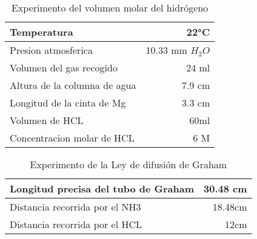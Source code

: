 \documentclass[../main.tex]{subfiles}
\begin{document}
\begin{table}[H]
    \centering
    \begin{tabular}{|l|r|}
        \hline
        Temperatura & 22°C \\
        \hline
        Presion atmosferica & 10.33 mm $H_2O$ \\
        \hline
        Volumen del gas recogido & 24 ml \\
        \hline
        Altura de la columna de agua & 7.9 cm \\
        \hline
        Longitud de la cinta de Mg & 3.3 cm \\
        \hline
        Volumen de HCL & 60ml \\
        \hline
        Concentracion molar de HCL & 6 M \\
        \hline
    \end{tabular}
    \caption{Experimento del volumen molar del hidrógeno}
    \label{tab:my_label}
\end{table}

\begin{table}[H]
    \centering
    \begin{tabular}{|l|r|}
        \hline
        Longitud precisa del tubo de Graham & 30.48 cm \\
        \hline
        Distancia recorrida por el NH3 & 18.48cm \\
        \hline
        Distancia recorrida por el HCL & 12cm \\
        \hline
    \end{tabular}
    \caption{Experimento de la Ley de difusión de Graham}
    \label{tab:my_label}
\end{table}
\end{document}

